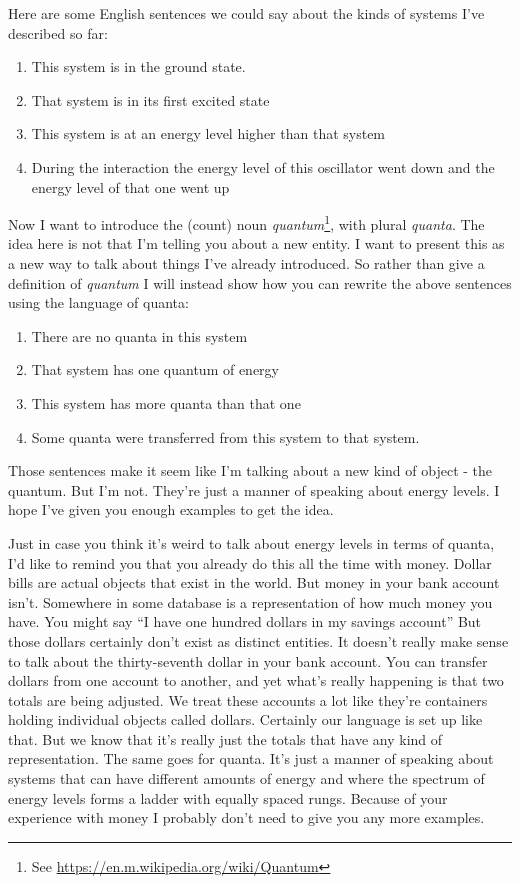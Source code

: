 \documentclass[a4paper]{article}
\begin{document}
Here are some English sentences we could say about the kinds of systems I've described so far:

\begin{enumerate}
\item This system is in the ground state.
\item That system is in its first excited state
\item This system is at an energy level higher than that system
\item During the interaction the energy level of this oscillator went down and the energy level of that one went up
\end{enumerate}

Now I want to introduce the (count) noun {\em quantum}\footnote{See \url{https://en.m.wikipedia.org/wiki/Quantum}}, with plural {\em quanta}.
The idea here is not that I'm telling you about a new entity.
I want to present this as a new way to talk about things I've already introduced.
So rather than give a definition of {\em quantum} I will instead show how you can rewrite the above sentences using the language of quanta:

\begin{enumerate}
\item There are no quanta in this system
\item That system has one quantum of energy
\item This system has more quanta than that one
\item Some quanta were transferred from this system to that system.
\end{enumerate}

Those sentences make it seem like I'm talking about a new kind of object - the quantum.
But I'm not.
They're just a manner of speaking about energy levels.
I hope I've given you enough examples to get the idea.

Just in case you think it's weird to talk about energy levels in terms of quanta, I'd like to remind you that you already do this all the time with money.
Dollar bills are actual objects that exist in the world.
But money in your bank account isn't.
Somewhere in some database is a representation of how much money you have.
You might say ``I have one hundred dollars in my savings account''
But those dollars certainly don't exist as distinct entities.
It doesn't really make sense to talk about the thirty-seventh dollar in your bank account.
You can transfer dollars from one account to another, and yet what's really happening is that two totals are being adjusted.
We treat these accounts a lot like they're containers holding individual objects called dollars.
Certainly our language is set up like that.
But we know that it's really just the totals that have any kind of representation.
The same goes for quanta.
It's just a manner of speaking about systems that can have different amounts of energy and where the spectrum of energy levels forms a ladder with equally spaced rungs.
Because of your experience with money I probably don't need to give you any more examples.
\end{document}
